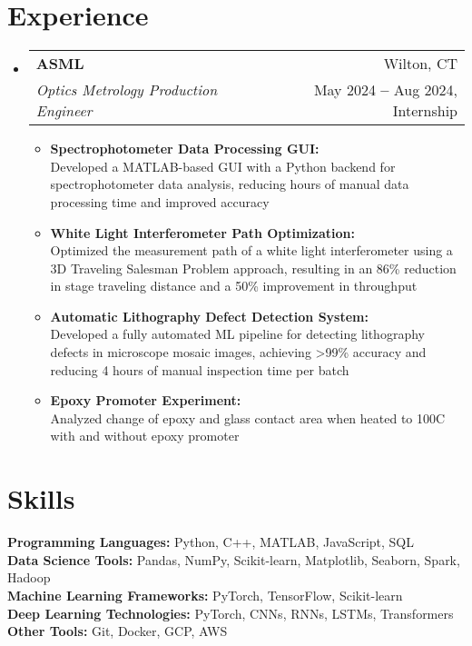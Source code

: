 \documentclass[a4paper,11pt]{article}
\makeatletter
\newcommand{\resumeItem}[1]{
  \item\small{
    {#1 \vspace{-0pt}}
  }
}
\newcommand{\resumeDoubleHeading}[4]{
  \vspace{-2pt}\item
    \begin{tabular*}{0.97\textwidth}[t]{l@{\extracolsep{\fill}}r}
        \textbf{#1} & #2 \\
        \textit{\small#3} & {\small #4} \\
    \end{tabular*}\vspace{-8pt}
}
\newcommand{\resumeSubHeadingListStart}{\begin{itemize}[leftmargin=0.15in, label={}]}
\newcommand{\resumeSubHeadingListEnd}{\end{itemize}}
\newcommand{\resumeItemListStart}{\begin{itemize}}
\newcommand{\resumeItemListEnd}{\end{itemize}\vspace{-5pt}}
\makeatother
\begin{document}
\section{Experience}
  \resumeSubHeadingListStart
    \resumeDoubleHeading
      {ASML}{Wilton, CT}
      {Optics Metrology Production Engineer}{May 2024 \textbf{--} Aug 2024, Internship}
        \resumeItemListStart
            \resumeItem{\textbf{Spectrophotometer Data Processing GUI:}\\
            Developed a MATLAB-based GUI with a Python backend for spectrophotometer data analysis, reducing hours of manual data processing time and improved accuracy}
            \resumeItem{\textbf{White Light Interferometer Path Optimization:}\\
            Optimized the measurement path of a white light interferometer using a 3D Traveling Salesman Problem approach, resulting in an 86\% reduction in stage traveling distance and a 50\% improvement in throughput}
            \resumeItem{\textbf{Automatic Lithography Defect Detection System:}\\
            Developed a fully automated ML pipeline for detecting lithography defects in microscope mosaic images, achieving \textgreater99\% accuracy and reducing 4 hours of manual inspection time per batch}
            \resumeItem{\textbf{Epoxy Promoter Experiment:}\\
            Analyzed change of epoxy and glass contact area when heated to 100\textdegree C with and without epoxy promoter}
        \resumeItemListEnd
  \resumeSubHeadingListEnd

\section{Skills}
  \resumeSubHeadingListStart
    \small{\item{
        \textbf{Programming Languages:}{ Python, C++, MATLAB, JavaScript, SQL} \\
        \textbf{Data Science Tools:}{ Pandas, NumPy, Scikit-learn, Matplotlib, Seaborn, Spark, Hadoop} \\ 
        \textbf{Machine Learning Frameworks:}{ PyTorch, TensorFlow, Scikit-learn} \\ 
        \textbf{Deep Learning Technologies:}{ PyTorch, CNNs, RNNs, LSTMs, Transformers} \\
        \textbf{Other Tools:}{ Git, Docker, GCP, AWS}
    }}
  \resumeSubHeadingListEnd
\end{document}
